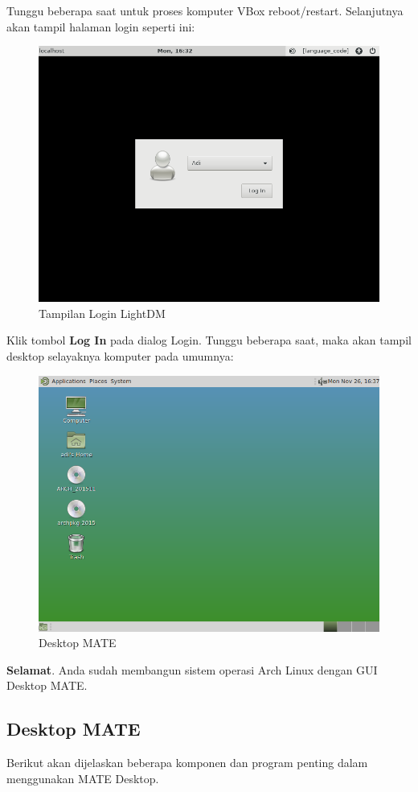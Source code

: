 \documentclass[12pt,]{article}
\begin{document}
	Tunggu beberapa saat untuk proses komputer VBox reboot/restart.
	Selanjutnya akan tampil halaman login seperti ini:
	\begin{figure}[H]
		\centering
		\includegraphics[width=0.6\linewidth]{images/vbox_gui/s1}
		\caption{Tampilan Login LightDM}
	\end{figure}
	Klik tombol \textbf{Log In} pada dialog Login.
	Tunggu beberapa saat, maka akan tampil desktop selayaknya komputer pada umumnya:
	\begin{figure}[H]
		\centering
		\includegraphics[width=0.6\linewidth]{images/vbox_gui/s2}
		\caption{Desktop MATE}
	\end{figure}
	\textbf{Selamat}. Anda sudah membangun sistem operasi Arch Linux dengan GUI Desktop MATE.

	\subsection{Desktop MATE}
	Berikut akan dijelaskan beberapa komponen dan program penting dalam menggunakan MATE Desktop.
\end{document}
